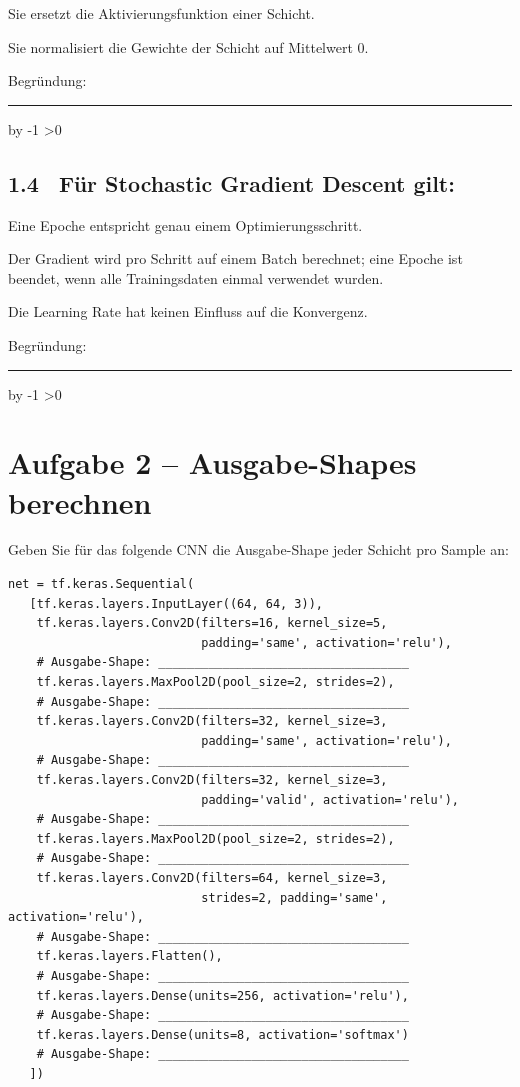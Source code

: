 \documentclass[10pt,a4paper]{article}
\newcommand{\mcbox}{\raisebox{-1pt}{\fbox{\rule{0pt}{7pt}\rule{7pt}{0pt}}}\hspace{6pt}}
\newcommand{\antwortlinien}[1]{%
  \par\vspace{2pt}%
  \newcount\zeilen \zeilen=#1
  \loop
    \noindent\rule{\linewidth}{0.4pt}\par\vspace{11pt}%
    \advance\zeilen by -1
  \ifnum\zeilen>0 \repeat
}
\begin{document}
\mcbox Sie ersetzt die Aktivierungsfunktion einer Schicht.

\mcbox Sie normalisiert die Gewichte der Schicht auf Mittelwert 0.

Begründung:
\antwortlinien{2}

\subsection*{1.4 \ Für Stochastic Gradient Descent gilt:}
\mcbox Eine Epoche entspricht genau einem Optimierungsschritt.

\mcbox Der Gradient wird pro Schritt auf einem Batch berechnet; eine Epoche ist beendet,
wenn alle Trainingsdaten einmal verwendet wurden.

\mcbox Die Learning Rate hat keinen Einfluss auf die Konvergenz.

Begründung:
\antwortlinien{2}

\section*{Aufgabe 2 -- Ausgabe-Shapes berechnen}

Geben Sie für das folgende CNN die Ausgabe-Shape jeder Schicht pro Sample an:

\begin{lstlisting}
net = tf.keras.Sequential(
   [tf.keras.layers.InputLayer((64, 64, 3)),
    tf.keras.layers.Conv2D(filters=16, kernel_size=5,
                           padding='same', activation='relu'),
    # Ausgabe-Shape: ___________________________________
    tf.keras.layers.MaxPool2D(pool_size=2, strides=2),
    # Ausgabe-Shape: ___________________________________
    tf.keras.layers.Conv2D(filters=32, kernel_size=3,
                           padding='same', activation='relu'),
    # Ausgabe-Shape: ___________________________________
    tf.keras.layers.Conv2D(filters=32, kernel_size=3,
                           padding='valid', activation='relu'),
    # Ausgabe-Shape: ___________________________________
    tf.keras.layers.MaxPool2D(pool_size=2, strides=2),
    # Ausgabe-Shape: ___________________________________
    tf.keras.layers.Conv2D(filters=64, kernel_size=3,
                           strides=2, padding='same', activation='relu'),
    # Ausgabe-Shape: ___________________________________
    tf.keras.layers.Flatten(),
    # Ausgabe-Shape: ___________________________________
    tf.keras.layers.Dense(units=256, activation='relu'),
    # Ausgabe-Shape: ___________________________________
    tf.keras.layers.Dense(units=8, activation='softmax')
    # Ausgabe-Shape: ___________________________________
   ])
\end{lstlisting}
\end{document}
